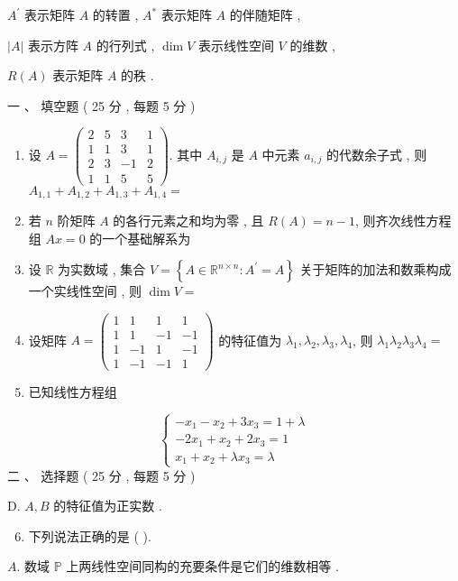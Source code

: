 \documentclass[10pt]{article}
\begin{document}
{$A^{\prime}$  表示矩阵  $A$  的转置 , $A^{*}$  表示矩阵  $A$  的伴随矩阵 ,

$|A|$  表示方阵  $A$  的行列式 , $\operatorname{dim} V$  表示线性空间  $V$  的维数 ,

$R(A)$  表示矩阵  $A$  的秩 .

 一 、 填空题 ( 25  分 , 每题 5 分 )

\begin{enumerate}
  \item  设  $A=\left(\begin{array}{cccc}2 & 5 & 3 & 1 \\ 1 & 1 & 3 & 1 \\ 2 & 3 & -1 & 2 \\ 1 & 1 & 5 & 5\end{array}\right)$.  其中  $A_{i, j}$  是  $A$  中元素  $a_{i, j}$  的代数余子式 ,  则  $A_{1,1}+A_{1,2}+A_{1,3}+A_{1,4}=$

  \item  若  $n$  阶矩阵  $A$  的各行元素之和均为零 ,  且  $R(A)=n-1$,  则齐次线性方程组  $A x=0$  的一个基础解系为 

  \item  设  $\mathbb{R}$  为实数域 ,  集合  $V=\left\{A \in \mathbb{R}^{n \times n}: A^{\prime}=A\right\}$  关于矩阵的加法和数乘构成一个实线性空间 ,  则  $\operatorname{dim} V=$

  \item  设矩阵  $A=\left(\begin{array}{cccc}1 & 1 & 1 & 1 \\ 1 & 1 & -1 & -1 \\ 1 & -1 & 1 & -1 \\ 1 & -1 & -1 & 1\end{array}\right)$  的特征值为  $\lambda_{1}, \lambda_{2}, \lambda_{3}, \lambda_{4}$,  则  $\lambda_{1} \lambda_{2} \lambda_{3} \lambda_{4}=$

  \item  已知线性方程组 

\end{enumerate}
$$
\left\{\begin{array}{l}
-x_{1}-x_{2}+3 x_{3}=1+\lambda \\
-2 x_{1}+x_{2}+2 x_{3}=1 \\
x_{1}+x_{2}+\lambda x_{3}=\lambda
\end{array}\right.
$$
 二 、  选择题 ( 25  分 , 每题  5  分 )

D. $A, B$  的特征值为正实数 .

\begin{enumerate}
  \setcounter{enumi}{5}
  \item  下列说法正确的是  ( ).
\end{enumerate}
$A$.  数域  $\mathbb{P}$  上两线性空间同构的充要条件是它们的维数相等 .

}
\end{document}
